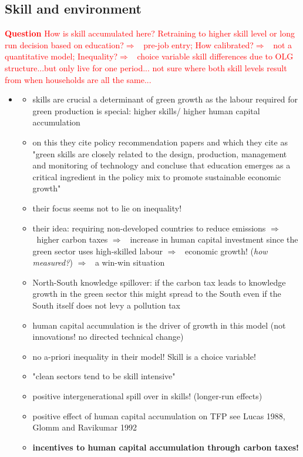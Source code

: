 \documentclass[12pt]{article}
\newcommand{\ar}{$\Rightarrow$ \ }
\newcommand{\tr}[1]{\textcolor{red}{#1}}
\begin{document}
\subsection{Skill and environment}
\tr{\textbf{Question} How is skill accumulated here? Retraining to higher skill level or long run decision based on education?\ar pre-job entry; How calibrated?\ar not a quantitative model; Inequality?\ar choice variable skill differences due to OLG structure...but only live for one period... not sure where both skill levels result from when households are all the same...}
\begin{itemize}
\item \cite{Borissov2019CarbonDevelopment}
\begin{itemize}
\item skills are crucial a determinant of green growth as the labour required for green production is special: higher skills/ higher human capital accumulation
\item on this they cite policy recommendation papers and \cite{Vona2018EnvironmentalExploration} which they cite as "green skills are closely related to the design, production, management and monitoring of technology and concluse that education emerges as a critical ingredient in the policy mix to promote sustainable economic growth"
\item their focus seems not to lie on inequality!
\item their idea: requiring non-developed countries to reduce emissions \ar higher carbon taxes \ar increase in human capital investment since the green sector uses high-skilled labour \ar economic growth! (\textit{how measured?}) \ar a win-win situation
\item North-South knowledge spillover: if the carbon tax leads to knowledge growth in the green sector this might spread to the South even if the South itself does not levy a pollution tax
\item human capital accumulation is the driver of growth in this model (not innovations! no directed technical change)
\item no a-priori inequality in their model! Skill is a choice variable! 
\item "clean sectors  tend to be skill intensive"
\item positive intergenerational spill over in skills! (longer-run effects)
\item positive effect of human capital accumulation on TFP see Lucas 1988, Glomm and Ravikumar 1992
\item \textbf{incentives to human capital accumulation through carbon taxes!}

\end{itemize}
\end{itemize}
\end{document}

